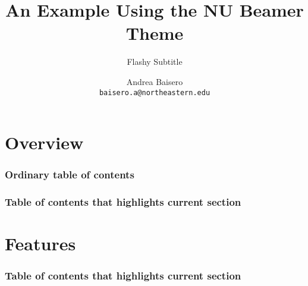 \documentclass{beamer}
\title{An Example Using the NU Beamer Theme}
\subtitle{Flashy Subtitle}
\author[A. Baisero]{Andrea Baisero\\\texttt{baisero.a@northeastern.edu}}
\institute{Northeastern University, Boston, USA}
\begin{document}
\section{Overview}

%
%
\begin{frame}
  \frametitle{Ordinary table of contents}

  \tableofcontents

\end{frame}

\begin{frame}
  \frametitle{Table of contents that highlights current section}

  \tableofcontents[currentsection]

\end{frame}

\section{Features}

\begin{frame}
  \frametitle{Table of contents that highlights current section}

  \tableofcontents[currentsection]

\end{frame}

\hidelogo
\end{document}
